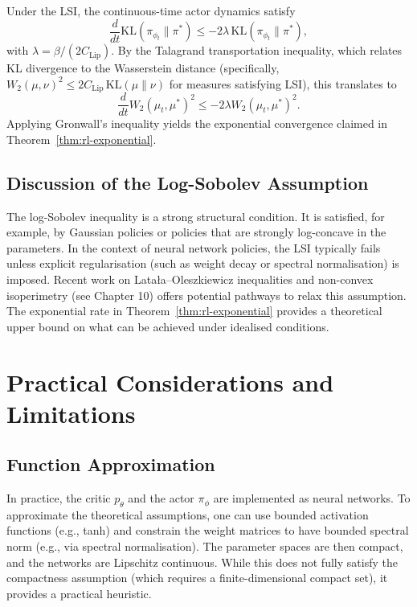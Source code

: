 Under the LSI, the continuous-time actor dynamics satisfy
\[
    \frac{d}{dt} \mathrm{KL}(\pi_{\phi_t} \| \pi^*) \leq -2\lambda\,
    \mathrm{KL}(\pi_{\phi_t} \| \pi^*),
\]
with $\lambda = \beta/(2C_{\mathrm{Lip}})$. By the Talagrand transportation
inequality, which relates KL divergence to the Wasserstein distance (specifically,
$W_2(\mu,\nu)^2 \leq 2 C_{\mathrm{Lip}}\, \mathrm{KL}(\mu\|\nu)$ for measures
satisfying LSI), this translates to
\[
    \frac{d}{dt} W_2(\mu_t, \mu^*)^2 \leq -2\lambda W_2(\mu_t, \mu^*)^2.
\]
Applying Gronwall's inequality yields the exponential convergence claimed in
Theorem~\ref{thm:rl-exponential}.

\subsection{Discussion of the Log-Sobolev Assumption}

The log-Sobolev inequality is a strong structural condition. It is satisfied, for
example, by Gaussian policies or policies that are strongly log-concave in the
parameters. In the context of neural network policies, the LSI typically fails
unless explicit regularisation (such as weight decay or spectral normalisation) is
imposed. Recent work on Lata\l a--Oleszkiewicz inequalities and non-convex
isoperimetry (see Chapter 10) offers potential pathways to relax this assumption. The
exponential rate in Theorem~\ref{thm:rl-exponential} provides a theoretical upper
bound on what can be achieved under idealised conditions.


\section{Practical Considerations and Limitations}
\label{sec:rl-implementation}

\subsection{Function Approximation}

In practice, the critic $p_\theta$ and the actor $\pi_\phi$ are implemented as
neural networks. To approximate the theoretical assumptions, one can use bounded
activation functions (e.g., tanh) and constrain the weight matrices to have bounded
spectral norm (e.g., via spectral normalisation). The parameter spaces are then
compact, and the networks are Lipschitz continuous. While this does not fully
satisfy the compactness assumption (which requires a finite-dimensional compact set),
it provides a practical heuristic.

